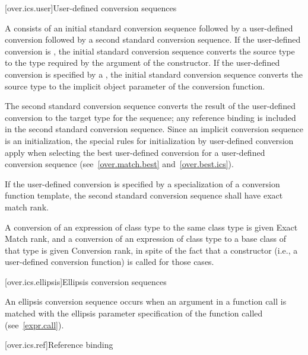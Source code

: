 [over.ics.user]{User-defined conversion sequences}

\pnum
A  consists of an initial
standard conversion sequence followed by a user-defined
conversion followed by a second standard
conversion sequence.
If the user-defined conversion is , the initial standard
conversion sequence converts the source type to the type required
by the argument of the constructor.
If the user-defined
conversion is specified by a , the
initial standard conversion sequence
converts the source type to the implicit object parameter of the
conversion function.

\pnum
The second standard conversion sequence converts the result of
the user-defined conversion to the target type for the sequence;
any reference binding is included in the second standard
conversion sequence.
Since an implicit conversion sequence is an initialization, the
special rules for initialization by user-defined conversion apply
when selecting the best user-defined conversion for a
user-defined conversion sequence (see~\ref{over.match.best} and~\ref{over.best.ics}).

\pnum
If the user-defined conversion is specified by a
specialization of a conversion function template,
the second standard conversion sequence shall have exact match rank.

\pnum
A conversion of an expression of class type
to the same class type is given Exact Match rank, and
a conversion of an expression of class type
to a base class of that type is given Conversion rank,
in spite of the
fact that a constructor (i.e., a user-defined conversion
function) is called for those cases.

[over.ics.ellipsis]{Ellipsis conversion sequences}

\pnum
{}%
An ellipsis conversion sequence occurs when an argument in a
function call is matched with the ellipsis parameter
specification of the function called (see~\ref{expr.call}).

[over.ics.ref]{Reference binding}

